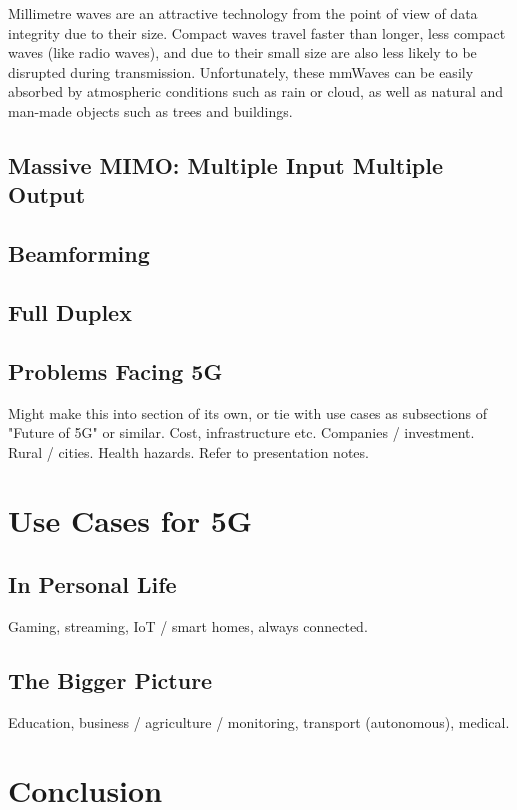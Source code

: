 \documentclass[journal]{IEEEtran}
\begin{document}
Millimetre waves are an attractive technology from the point of view of data integrity due to their size. Compact waves travel faster than longer, less compact waves (like radio waves), and due to their small size are also less likely to be disrupted during transmission. Unfortunately, these mmWaves can be easily absorbed by atmospheric conditions such as rain or cloud, as well as natural and man-made objects such as trees and buildings.


\subsection{Massive MIMO: Multiple Input Multiple Output}
\subsection{Beamforming}
\subsection{Full Duplex}
\subsection{Problems Facing 5G}
Might make this into section of its own, or tie with use cases as subsections of "Future of 5G" or similar.
Cost, infrastructure etc. Companies / investment. Rural / cities. Health hazards. Refer to presentation notes.

\section{Use Cases for 5G}
\subsection{In Personal Life}
Gaming, streaming, IoT / smart homes, always connected.
\subsection{The Bigger Picture}
Education, business / agriculture / monitoring, transport (autonomous), medical.

\section{Conclusion}

\printbibliography
\end{document}
